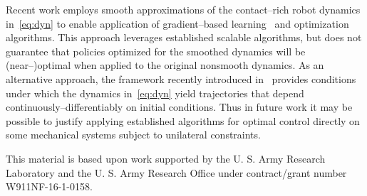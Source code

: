 \documentclass{article}
\begin{document}
Recent work employs smooth approximations of the contact--rich robot dynamics in~\eqref{eq:dyn} to enable application of gradient--based learning~\cite{Levine2014-im, Levine2016-lw, Kumar2016-nt} and optimization~\cite{Erez2012-yo, Mordatch2012-ar, Mordatch2015-jb} algorithms.
This approach leverages established scalable algorithms,
but does not guarantee that policies optimized for the smoothed dynamics will be (near--)optimal when applied to the original nonsmooth dynamics.
As an alternative approach, 
the framework recently introduced in~\cite{Pace2017-ph}
provides conditions under which the dynamics in~\eqref{eq:dyn} yield trajectories that depend continuously--differentiably on initial conditions.
Thus in future work it may be possible to justify applying established algorithms for optimal control directly on some mechanical systems subject to unilateral constraints.




\clearpage

\acknowledgments%
{This material is based upon work supported by the U. S. Army Research Laboratory and the U. S. Army Research Office under contract/grant number W911NF-16-1-0158.}


{%
}
\end{document}
